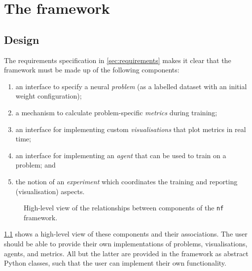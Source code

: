 \chapter{The framework}
\label{chap:framework}

\section{Design}
The requirements specification in \ref{sec:requirements} makes it clear that the framework must be made up of the following components:
\begin{enumerate}
    \item an interface to specify a neural \textit{problem} (as a labelled dataset with an initial weight configuration);
    \item a mechanism to calculate problem-specific \textit{metrics} during training;
    \item an interface for implementing custom \textit{visualisations} that plot metrics in real time;
    \item an interface for implementing an \textit{agent} that can be used to train on a problem; and
    \item the notion of an \textit{experiment} which coordinates the training and reporting (visualisation) aspects.
\end{enumerate}
\begin{figure}
    \centering
    \caption{High-level view of the relationships between components of the \texttt{nf} framework.}
    \label{fig:nf_components}
\end{figure}
\ref{fig:nf_components} shows a high-level view of these components and their associations. 
The user should be able to provide their own implementations of problems, visualisations, agents, and metrics. 
All but the latter are provided in the framework as abstract Python classes, such that the user can implement their own functionality.

